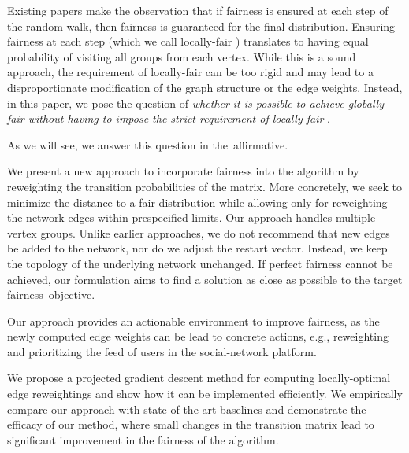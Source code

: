 \documentclass[sigconf, anonymous, review]{acmart}
\begin{document}
\vspace{1mm}
Existing papers 
\citep{khajehnejad_crosswalk_2022,rahman_fairwalk_2019,tsioutsiouliklis_fairness-aware_2021} 
make the observation 
that if fairness is ensured at each step of the \pagerank random walk,
then fairness is guaranteed for the final \pagerank distribution.
Ensuring fairness at each step (which we call locally-fair \pagerank)
translates to having equal probability of visiting all groups from each vertex. 
While this is a sound approach, 
the requirement of locally-fair \pagerank can be too rigid and may lead to a
disproportionate modification of the graph structure or the edge weights. 
Instead, in this paper, we pose the question of \emph{whether it is possible to 
achieve globally-fair \pagerank without having to impose the strict requirement of 
locally-fair \pagerank}.

As we will see, we answer this question in the~affirmative.

\vspace{1mm}
We present a new approach to incorporate fairness into the \pagerank algorithm by re\-weighting the transition probabilities of the \pagerank matrix. 
More concretely, we seek to minimize the \pagerank distance to a fair distribution while allowing only for re\-weighting the network edges within pre\-specified limits. 
Our approach handles multiple vertex groups.
Unlike earlier approaches, 
we do not recommend that new edges be added to the network, nor do we adjust the restart vector. 
Instead, we keep the topology of the underlying network unchanged. 
%
If perfect fairness cannot be achieved,
our formulation aims to find a solution as close as possible to the target fairness~objective.

Our approach provides an actionable environment to improve    \pagerank fairness, 
as the newly computed edge weights 
can be lead to concrete actions, e.g., 
re\-weighting and prioritizing the feed of users in the social-network platform. 

We propose a projected gradient descent method for computing locally-optimal edge re\-weightings and show how it can be implemented efficiently. 
We empirically compare our approach with state-of-the-art baselines
and demonstrate the efficacy of our method, 
where small changes in the transition matrix lead to significant improvement 
in the fairness of the \pagerank algorithm.
\end{document}
